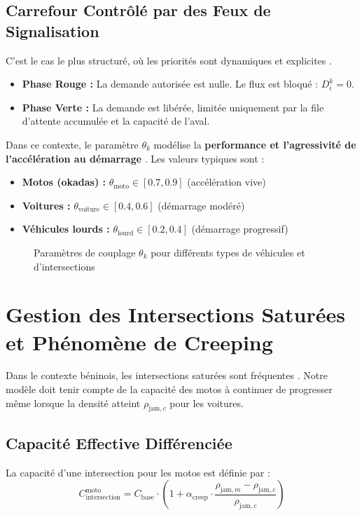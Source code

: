 \subsection{Carrefour Contrôlé par des Feux de Signalisation}
C'est le cas le plus structuré, où les priorités sont dynamiques et explicites \cite{BandRascle2009}.
\begin{itemize}
    \item \textbf{Phase Rouge :} La demande autorisée est nulle. Le flux est bloqué : $ D_i^k = 0 $.
    \item \textbf{Phase Verte :} La demande est libérée, limitée uniquement par la file d'attente accumulée et la capacité de l'aval.
\end{itemize}
Dans ce contexte, le paramètre $ \theta_k $ modélise la \textbf{performance et l'agressivité de l'accélération au démarrage} \cite{JinZhang2003}. Les valeurs typiques sont :
\begin{itemize}
    \item \textbf{Motos (okadas) :} $ \theta_{\text{moto}} \in [0.7, 0.9] $ (accélération vive)
    \item \textbf{Voitures :} $ \theta_{\text{voiture}} \in [0.4, 0.6] $ (démarrage modéré)
    \item \textbf{Véhicules lourds :} $ \theta_{\text{lourd}} \in [0.2, 0.4] $ (démarrage progressif)
\end{itemize}

\begin{figure}[htbp]
\centering
\caption{Paramètres de couplage $\theta_k$ pour différents types de véhicules et d'intersections}
\label{fig:parametres_couplage}
\end{figure}

\section{Gestion des Intersections Saturées et Phénomène de Creeping}
Dans le contexte béninois, les intersections saturées sont fréquentes \cite{Saumtally2012}. Notre modèle doit tenir compte de la capacité des motos à continuer de progresser même lorsque la densité atteint $ \rho_{\text{jam},c} $ pour les voitures.

\subsection{Capacité Effective Différenciée}
La capacité d'une intersection pour les motos est définie par :
\[
C_{\text{intersection}}^{\text{moto}} = C_{\text{base}} \cdot \left(1 + \alpha_{\text{creep}} \cdot \frac{\rho_{\text{jam},m} - \rho_{\text{jam},c}}{\rho_{\text{jam},c}}\right)
\]

